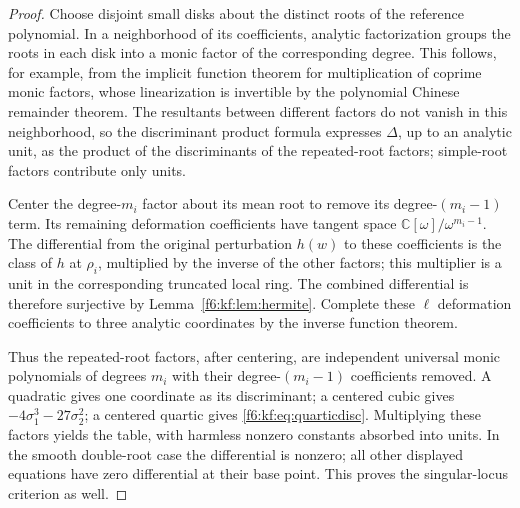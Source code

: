 \documentclass[11pt,a4paper]{article}
\theoremstyle{definition}
\newcommand{\C}{\mathbb C}
\begin{document}
\begin{proof}
Choose disjoint small disks about the distinct roots of the reference
polynomial. In a neighborhood of its coefficients, analytic factorization
groups the roots in each disk into a monic factor of the corresponding
degree. This follows, for example, from the implicit function theorem for
multiplication of coprime monic factors, whose linearization is invertible
by the polynomial Chinese remainder theorem. The resultants between
different factors do not vanish in this neighborhood, so the discriminant
product formula expresses $\Delta$, up to an analytic unit, as the product of
the discriminants of the repeated-root factors; simple-root factors
contribute only units.

Center the degree-$m_i$ factor about its mean root to remove its
degree-$(m_i-1)$ term. Its remaining deformation coefficients have tangent
space $\C[\omega]/\omega^{m_i-1}$. The differential from the original
perturbation $h(w)$ to these coefficients is the class of $h$ at $\rho_i$,
multiplied by the inverse of the other factors; this multiplier is a unit in
the corresponding truncated local ring. The combined differential is
therefore surjective by Lemma~\ref{f6:kf:lem:hermite}. Complete these $\ell$
deformation coefficients to three analytic coordinates by the inverse
function theorem.

Thus the repeated-root factors, after centering, are independent universal
monic polynomials of degrees $m_i$ with their degree-$(m_i-1)$ coefficients
removed. A quadratic gives one coordinate as its discriminant; a centered
cubic gives $-4\sigma_1^3-27\sigma_2^2$; a centered quartic gives
\eqref{f6:kf:eq:quarticdisc}. Multiplying these factors yields the table,
with harmless nonzero constants absorbed into units. In the smooth
double-root case the differential is nonzero; all other displayed equations
have zero differential at their base point. This proves the singular-locus
criterion as well.
\end{proof}

\end{document}

